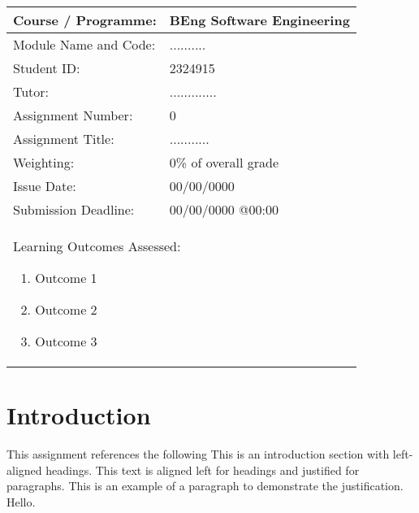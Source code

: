 \documentclass[]{article}
\begin{document}
\begin{table}[h]
  \centering
  \begin{tabular}{|l|l|}
      \hline
      Course / Programme: & BEng Software Engineering \\
      \hline
      Module Name and Code: & .......... \\
      \hline
      Student ID: & 2324915 \\
      \hline
      Tutor: & ............. \\
      \hline
      Assignment Number: & 0 \\
      \hline
      Assignment Title: & ........... \\
      \hline
      Weighting: & 0\% of overall grade \\
      \hline
      Issue Date: & 00/00/0000 \\
      \hline
      Submission Deadline: & 00/00/0000 @00:00 \\
      \hline
      \multicolumn{2}{|l|}{
        \begin{minipage}{\dimexpr\textwidth-2\tabcolsep\relax} %
        \vspace{8pt} %
        Learning Outcomes Assessed:
          \begin{enumerate}
            \item Outcome 1
            \item Outcome 2
            \item Outcome 3
          \end{enumerate}
          \vspace{8pt} %
        \end{minipage}
      } \\
      \hline
  \end{tabular}
\end{table}

\newpage

\tableofcontents

\newpage 

\section{Introduction}
\label{sec:introduction}
This assignment references the following \cite{flanagan_2011_javascript}
This is an introduction section with left-aligned headings. This text is aligned left for headings and justified for paragraphs. This is an example of a paragraph to demonstrate the justification. Hello.
\end{document}
